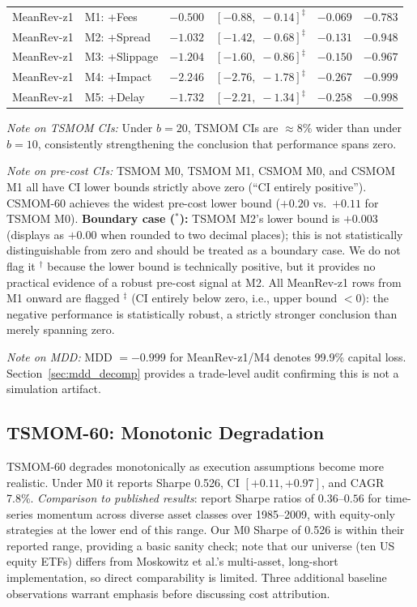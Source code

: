 \documentclass[12pt]{article}
\begin{document}
\begin{table}[H]
\begin{tabular}{llrrrr}
MeanRev-z1 & M1: +Fees       & $-0.500$ & $[-0.88,\;-0.14]^\ddagger$ & $-0.069$ & $-0.783$ \\
MeanRev-z1 & M2: +Spread     & $-1.032$ & $[-1.42,\;-0.68]^\ddagger$ & $-0.131$ & $-0.948$ \\
MeanRev-z1 & M3: +Slippage   & $-1.204$ & $[-1.60,\;-0.86]^\ddagger$ & $-0.150$ & $-0.967$ \\
MeanRev-z1 & M4: +Impact     & $-2.246$ & $[-2.76,\;-1.78]^\ddagger$ & $-0.267$ & $-0.999$ \\
MeanRev-z1 & M5: +Delay      & $-1.732$ & $[-2.21,\;-1.34]^\ddagger$ & $-0.258$ & $-0.998$ \\
\bottomrule
\end{tabular}
\begin{tablenotes}\small
\item \textit{Note on TSMOM CIs:} Under $b = 20$, TSMOM CIs are
$\approx 8\%$ wider than under $b = 10$, consistently strengthening
the conclusion that performance spans zero.
\item \textit{Note on pre-cost CIs:} TSMOM M0, TSMOM M1, CSMOM M0,
and CSMOM M1 all have CI lower bounds strictly above zero (``CI entirely
positive''). CSMOM-60 achieves the widest pre-cost lower bound
($+0.20$ vs.\ $+0.11$ for TSMOM M0). \textbf{Boundary case ($^*$):} TSMOM M2's lower bound is $+0.003$
(displays as $+0.00$ when rounded to two decimal places); this is not
statistically distinguishable from zero and should be treated as a
boundary case. We do not flag it $^\dagger$ because the lower bound is
technically positive, but it provides no practical evidence of a robust
pre-cost signal at M2.
All MeanRev-z1 rows from M1 onward are flagged $^\ddagger$ (CI entirely
below zero, i.e., upper bound $< 0$): the negative performance is
statistically robust, a strictly stronger conclusion than merely
spanning zero.
\item \textit{Note on MDD:} MDD $= -0.999$ for MeanRev-z1/M4
denotes 99.9\% capital loss. Section~\ref{sec:mdd_decomp} provides
a trade-level audit confirming this is not a simulation artifact.
\end{tablenotes}
\end{table}

\subsection{TSMOM-60: Monotonic Degradation}
\label{sec:tsmom_results}

TSMOM-60 degrades monotonically as execution assumptions become more
realistic. Under M0 it reports Sharpe 0.526, CI $[+0.11, +0.97]$, and
CAGR 7.8\%. \textit{Comparison to published results}: \citet{moskowitz2012time}
report Sharpe ratios of $0.36$--$0.56$ for time-series momentum across
diverse asset classes over 1985--2009, with equity-only strategies
at the lower end of this range. Our M0 Sharpe of 0.526 is within their
reported range, providing a basic sanity check; note that our universe
(ten US equity ETFs) differs from Moskowitz et al.'s multi-asset,
long-short implementation, so direct comparability is limited.
Three additional baseline observations warrant emphasis before
discussing cost attribution.
\end{document}
